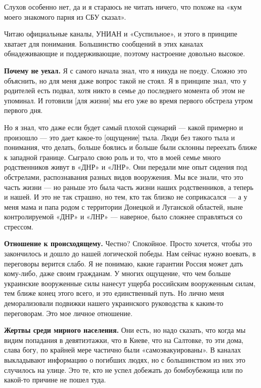 \begin{fancyquotes}
    Слухов особенно нет, да и я стараюсь не читать ничего, что похоже на «кум моего знакомого парня из СБУ сказал».
\end{fancyquotes}

Читаю официальные каналы, УНИАН и «Суспильное», и этого в принципе хватает для понимания. Большинство сообщений в этих каналах обнадеживающие и поддерживающие, поэтому настроение довольно высокое.

\textbf{Почему не уехал.}
Я с самого начала знал, что я никуда не поеду. Сложно это объяснить, но для меня даже вопрос такой не стоял. Я в принципе знал, что у родителей есть подвал, хотя никто в семье до последнего момента об этом не упоминал. И готовили [для жизни] мы его уже во время первого обстрела утром первого дня.

Но я знал, что даже если будет самый плохой сценарий — какой примерно и произошло — это дает какое-то [ощущение] тыла. Люди без такого тыла и понимания, что делать, больше боялись и больше были склонны переехать ближе к западной границе. Сыграло свою роль и то, что в моей семье много родственников живут в «ДНР» и «ЛНР». Они передали мне опыт сидения под обстрелами, распознавания разных видов вооружения. Мы все знали, что это часть жизни — но раньше это была часть жизни наших родственников, а теперь и нашей. И это не так страшно, но тем, кто так близко не соприкасался — а у меня мама и папа родом с территории Донецкой и Луганской областей, ныне контролируемой «ДНР» и «ЛНР» — наверное, было сложнее справляться со стрессом.

\textbf{Отношение к происходящему.} Честно? Спокойное. Просто хочется, чтобы это закончилось и дошло до нашей логической победы. Нам сейчас нужно воевать, в переговоры верится слабо. Я не понимаю, какие гарантии Россия может дать кому-либо, даже своим гражданам. У многих ощущение, что чем больше украинские вооруженные силы нанесут ущерба российским вооруженным силам, тем ближе конец этого всего, и это единственный путь. Но лично меня деморализовали подвижки нашего украинского руководства к каким-то переговорам. Это мое личное отношение.



\textbf{Жертвы среди мирного населения.} Они есть, но надо сказать, что когда мы видим попадания в девятиэтажки, что в Киеве, что на Салтовке, то эти дома, слава богу, по крайней мере частично были «самоэвакуированы». В каналах выкладывают информацию о погибших людях, но с большинством из них это случилось на улице. Это те, кто не успел добежать до бомбоубежища или по какой-то причине не пошел туда.

